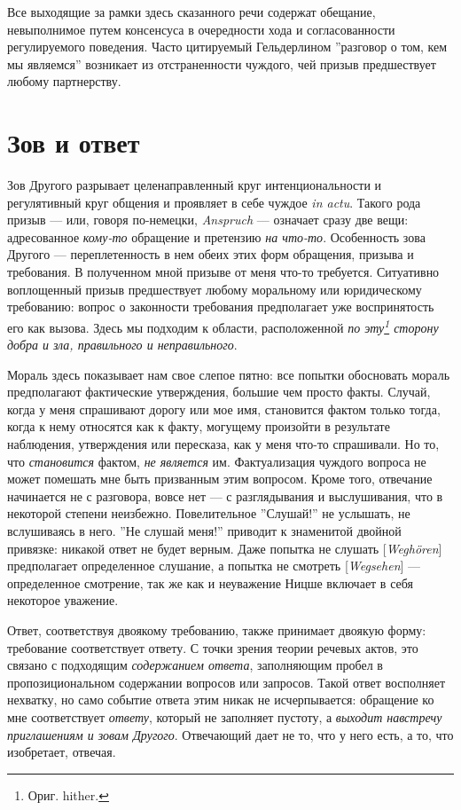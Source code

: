 \documentclass[12pt]{book}
\begin{document}
Все выходящие за рамки здесь сказанного речи содержат обещание, невыполнимое путем консенсуса в очередности хода и согласованности регулируемого поведения. Часто цитируемый Гельдерлином ''разговор о том, кем мы являемся'' возникает из отстраненности чуждого, чей призыв предшествует любому партнерству.

\section{Зов и ответ}

Зов Другого разрывает целенаправленный круг интенциональности и регулятивный круг общения и проявляет в себе чуждое \textit{in actu}. Такого рода призыв --- или, говоря по-немецки, \textit{Anspruch} --- означает сразу две вещи: адресованное \textit{кому-то} обращение и претензию \textit{на что-то}. Особенность зова Другого --- переплетенность в нем обеих этих форм обращения, призыва и требования. В полученном мной призыве от меня что-то требуется. Ситуативно воплощенный призыв предшествует любому моральному или юридическому требованию: вопрос о законности требования предполагает уже воспринятость его как вызова. Здесь мы подходим к области, расположенной \textit{по эту\footnote{Ориг. hither.} сторону добра и зла, правильного и неправильного}.

Мораль здесь показывает нам свое слепое пятно: все попытки обосновать мораль предполагают фактические утверждения, большие чем просто факты. Случай, когда у меня спрашивают дорогу или мое имя, становится фактом только тогда, когда к нему относятся как к факту, могущему произойти в результате наблюдения, утверждения или пересказа, как у меня что-то спрашивали. Но то, что \textit{становится} фактом, \textit{не является} им. Фактуализация чуждого вопроса не может помешать мне быть призванным этим вопросом. Кроме того, отвечание начинается не с разговора, вовсе нет --- с разглядывания и выслушивания, что в некоторой степени неизбежно. Повелительное ''Слушай!'' не услышать, не вслушиваясь в него. ''Не слушай меня!'' приводит к знаменитой двойной привязке: никакой ответ не будет верным. Даже попытка не слушать [\textit{Weghören}] предполагает определенное слушание, а попытка не смотреть [\textit{Wegsehen}] --- определенное смотрение, так же как и неуважение Ницше включает в себя некоторое уважение.

Ответ, соответствуя двоякому требованию, также принимает двоякую форму: требование соответствует ответу. С точки зрения теории речевых актов, это связано с подходящим \textit{содержанием ответа}, заполняющим пробел в пропозициональном содержании вопросов или запросов. Такой ответ восполняет нехватку, но само событие ответа этим никак не исчерпывается: обращение ко мне соответствует \textit{ответу}, который не заполняет пустоту, а \textit{выходит навстречу приглашениям и зовам Другого}. Отвечающий дает не то, что у него есть, а то, что изобретает, отвечая.
\end{document}

